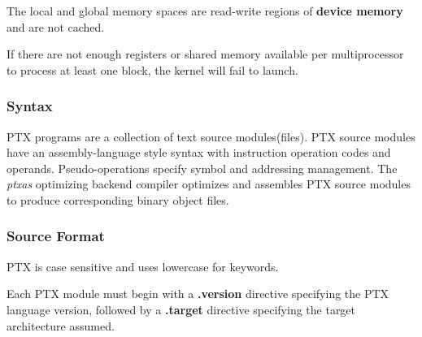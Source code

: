 The local and global memory spaces are read-write regions of \textbf{device memory} and are not cached.

If there are not enough registers or shared memory available per multiprocessor to process at least one block, the kernel will fail to launch.

\subsubsection{Syntax}
PTX programs are a collection of text source modules(files). PTX source modules have an assembly-language style syntax with instruction operation codes and operands. Pseudo-operations specify symbol and addressing management. The \textit{ptxas}
optimizing backend compiler optimizes and assembles PTX source modules to produce
corresponding binary object files.
\subsubsection{Source Format}
PTX is case sensitive and uses lowercase for keywords.

Each PTX module must begin with a \textbf{.version} directive specifying the PTX language version, followed by a \textbf{.target} directive specifying the target architecture assumed. 

